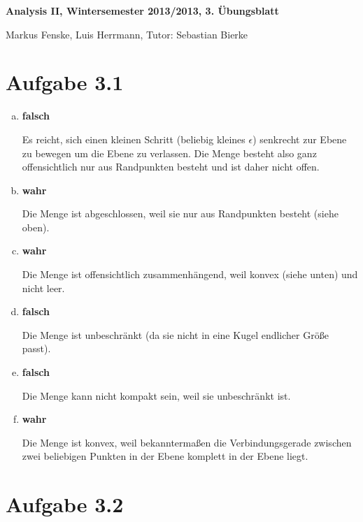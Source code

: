 \documentclass[a4paper,german,12pt,smallheadings]{scrartcl}
\begin{document}
\begin{center}
\bfseries %
\sffamily %
\vspace{-40pt}
Analysis II, Wintersemester 2013/2013, 3. Übungsblatt

Markus Fenske, Luis Herrmann, Tutor: Sebastian Bierke
\vspace{-10pt}
\end{center}

\section*{Aufgabe 3.1}
\begin{enumerate}[a)]
  \item
    \textbf{falsch}

    Es reicht, sich einen kleinen Schritt (beliebig kleines
    $\epsilon$) senkrecht zur Ebene zu bewegen um die Ebene zu verlassen.
    Die Menge besteht also ganz offensichtlich nur aus Randpunkten
    besteht und ist daher nicht offen.
  \item
    \textbf{wahr}

    Die Menge ist abgeschlossen, weil sie nur aus Randpunkten besteht (siehe
    oben).
  \item
    \textbf{wahr}

    Die Menge ist offensichtlich zusammenhängend, weil konvex (siehe unten) und
    nicht leer.

  \item
    \textbf{falsch}

    Die Menge ist unbeschränkt (da sie nicht in eine Kugel endlicher Größe passt).
  \item
    \textbf{falsch}

    Die Menge kann nicht kompakt sein, weil sie unbeschränkt ist.
  \item
    \textbf{wahr}

    Die Menge ist konvex, weil bekanntermaßen die Verbindungsgerade zwischen
    zwei beliebigen Punkten in der Ebene komplett in der Ebene liegt.
\end{enumerate}

\section*{Aufgabe 3.2}
\end{document}
